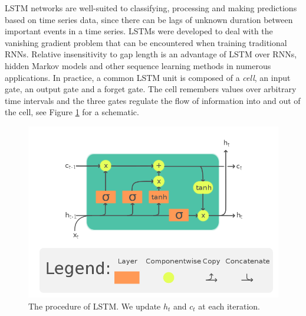 \documentclass[twoside]{report}
\begin{document}
\begin{spacing}{1}
LSTM networks are well-suited to classifying, processing and making predictions based on time series data, since there can be lags of unknown duration between important events in a time series. LSTMs were developed to deal with the vanishing gradient problem that can be encountered when training traditional RNNs. Relative insensitivity to gap length is an advantage of LSTM over RNNs, hidden Markov models and other sequence learning methods in numerous applications. In practice, a common LSTM unit is composed of a \textit{cell}, an input gate, an output gate and a forget gate. The cell remembers values over arbitrary time intervals and the three gates regulate the flow of information into and out of the cell, see Figure \ref{fig:LSTM} for a schematic.

\begin{figure}[!htbp]
    \centering
    \includegraphics[scale = 0.4]{Images/LSTM.png}
    \caption{The procedure of LSTM. We update $h_t$ and $c_t$ at each iteration.}
    \label{fig:LSTM}
\end{figure}




\end{spacing}
\end{document}
